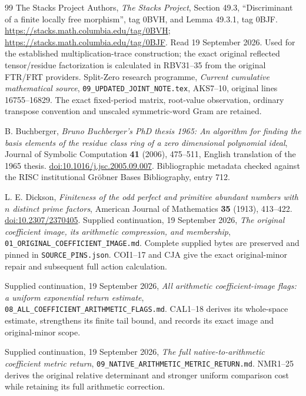 \begin{thebibliography}{99}
The Stacks Project Authors, \emph{The Stacks Project},
Section 49.3, ``Discriminant of a finite locally free morphism'',
tag 0BVH, and Lemma 49.3.1, tag 0BJF.
\url{https://stacks.math.columbia.edu/tag/0BVH};
\url{https://stacks.math.columbia.edu/tag/0BJF}.
Read 19 September 2026. Used for the established multiplication-trace
construction; the exact original reflected tensor/residue factorization
is calculated in RBV31--35 from the original FTR/FRT providers.
Split-Zero research programme,
\emph{Current cumulative mathematical source},
\texttt{09\_UPDATED\_JOINT\_NOTE.tex}, AKS7--10,
original lines 16755--16829.
The exact fixed-period matrix, root-value observation, ordinary
transpose convention and unscaled symmetric-word Gram are retained.

B. Buchberger,
\emph{Bruno Buchberger's PhD thesis 1965:
An algorithm for finding the basis elements of the residue class ring
of a zero dimensional polynomial ideal},
Journal of Symbolic Computation \textbf{41} (2006), 475--511,
English translation of the 1965 thesis.
\href{https://doi.org/10.1016/j.jsc.2005.09.007}
{doi:10.1016/j.jsc.2005.09.007}.
Bibliographic metadata checked against the RISC institutional
Gr\"obner Bases Bibliography, entry 712.

L. E. Dickson,
\emph{Finiteness of the odd perfect and primitive abundant numbers
with \(n\) distinct prime factors},
American Journal of Mathematics \textbf{35} (1913), 413--422.
\href{https://doi.org/10.2307/2370405}{doi:10.2307/2370405}.
Supplied continuation, 19 September 2026,
\emph{The original coefficient image, its arithmetic compression,
and membership}, \texttt{01\_ORIGINAL\_COEFFICIENT\_IMAGE.md}.
Complete supplied bytes are preserved and pinned in
\texttt{SOURCE\_PINS.json}. COI1--17 and CJA give the exact
original-minor repair and subsequent full action calculation.

Supplied continuation, 19 September 2026,
\emph{All arithmetic coefficient-image flags: a uniform exponential
return estimate}, \texttt{08\_ALL\_COEFFICIENT\_ARITHMETIC\_FLAGS.md}.
CAL1--18 derives its whole-space estimate, strengthens its finite
tail bound, and records its exact image and original-minor scope.

Supplied continuation, 19 September 2026,
\emph{The full native-to-arithmetic coefficient metric return},
\texttt{09\_NATIVE\_ARITHMETIC\_METRIC\_RETURN.md}.
NMR1--25 derives the original relative determinant and stronger
uniform comparison cost while retaining its full arithmetic correction.


\end{thebibliography}
